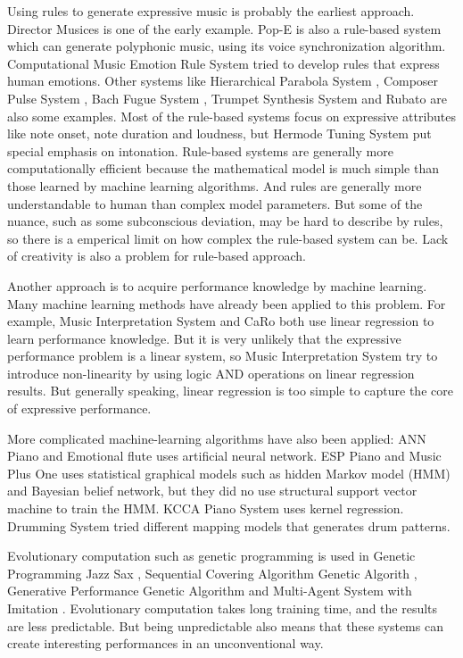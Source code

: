 Using rules to generate expressive music is probably the earliest approach. Director Musices \cite{17} is one of the early example.  Pop-E \cite{28} is also a rule-based system which can generate polyphonic music, using its voice synchronization algorithm. Computational Music Emotion Rule System \cite{31} tried to develop rules that express human emotions. Other systems like Hierarchical Parabola System \cite{17,18,19,20}, Composer Pulse System \cite{21,22}, Bach Fugue System \cite{23}, Trumpet Synthesis System \cite{24, 25} and Rubato \cite{26, 27} are also some examples. Most of the rule-based systems focus on expressive attributes like note onset, note duration and loudness, but Hermode Tuning System \cite{29} put special emphasis on intonation. Rule-based systems are generally more computationally efficient because the mathematical model is much simple than those learned by machine learning algorithms. And rules are generally more understandable to human than complex model parameters. But some of the nuance, such as some subconscious deviation, may be hard to describe by rules, so there is a emperical limit on how complex the rule-based system can be. Lack of creativity is also a problem for rule-based approach.

Another approach is to acquire performance knowledge by machine learning. Many machine learning methods have already been applied to this problem. For example, Music Interpretation System \cite{32,33,34} and CaRo \cite{35,36,37} both use linear regression to learn performance knowledge. But it is very unlikely that the expressive performance problem is a linear system, so Music Interpretation System try to introduce non-linearity by using logic AND operations on linear regression results. But generally speaking, linear regression is too simple to capture the core of expressive performance.

More complicated machine-learning algorithms have also been applied: ANN Piano \cite{38} and Emotional flute \cite{39} uses artificial neural network. ESP Piano \cite{55} and Music Plus One \cite{52,53,54} uses statistical graphical models such as hidden Markov model (HMM) and Bayesian belief network, but they did no use structural support vector machine to train the HMM.%
 KCCA Piano System \cite{57} uses kernel regression. Drumming System \cite{82} tried different mapping models that generates drum patterns.

Evolutionary computation such as genetic programming is used in Genetic Programming Jazz Sax \cite{88}, Sequential Covering Algorithm Genetic Algorith \cite{59}, Generative Performance Genetic Algorithm \cite{89} and Multi-Agent System with Imitation \cite{60, 93}. Evolutionary computation takes long training time, and the results are less predictable. But being unpredictable also means that these systems can create interesting performances in an unconventional way.

